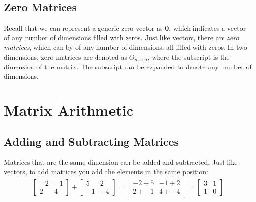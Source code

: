 \begin{Answer}[ref = mat_dim1]

\end{Answer}

\begin{Exercise}[title = {Matrix Dimensions 2}, label = mat_dim2]

\end{Exercise}

\begin{Answer}[ref = mat_dim2]

\end{Answer}

\subsection{Zero Matrices}
Recall that we can represent a generic zero vector as \textbf{0}, which 
indicates a vector of any number of dimensions filled with zeros. Just like 
vectors, there are \textit{zero matrices}, which can by of 
any number of dimensions, all filled with zeros. In two dimensions, zero 
matrices are denoted as $\mathbf{\mathit{O}}_{m \times n}$, where the 
subscript is the dimension of the matrix. The subscript can be expanded to 
denote any number of dimensions. 

\section{Matrix Arithmetic}
\subsection{Adding and Subtracting Matrices}
Matrices that are the same dimension can be added and subtracted. Just like 
vectors, to add matrices you add the elements in the same position:
$$\begin{bmatrix}
-2 & -1\\
2 & 4
\end{bmatrix}
+ \begin{bmatrix}
5 & 2\\
-1 & -4
\end{bmatrix}
= \begin{bmatrix}
-2 + 5 & -1 + 2\\
2 + -1 & 4 + -4
\end{bmatrix} = 
\begin{bmatrix}
3 & 1\\
1 & 0
\end{bmatrix}$$

